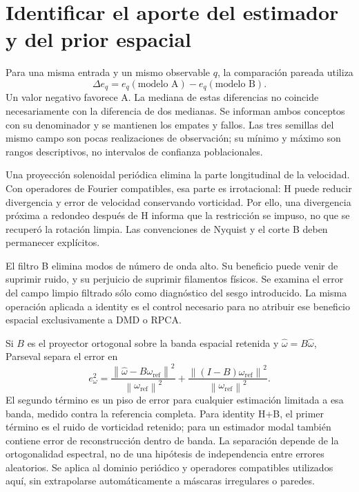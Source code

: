 \documentclass[11pt,oneside,openany]{book}
\newcommand{\norm}[1]{\left\lVert #1\right\rVert}
\begin{document}
\section{Identificar el aporte del estimador y del prior espacial}
Para una misma entrada y un mismo observable $q$, la comparación pareada
utiliza
\begin{equation}
 \Delta e_q=e_q(\text{modelo A})-e_q(\text{modelo B}).
\end{equation}
Un valor negativo favorece A. La mediana de estas diferencias no coincide
necesariamente con la diferencia de dos medianas. Se informan ambos conceptos
con su denominador y se mantienen los empates y fallos. Las tres semillas
del mismo campo son pocas realizaciones de observación; su mínimo y máximo
son rangos descriptivos, no intervalos de confianza poblacionales.

Una proyección solenoidal periódica elimina la parte longitudinal de la
velocidad. Con operadores de Fourier compatibles, esa parte es irrotacional:
H puede reducir divergencia y error de velocidad conservando vorticidad.
Por ello, una divergencia próxima a redondeo después de H informa que la
restricción se impuso, no que se recuperó la rotación limpia. Las convenciones
de Nyquist y el corte B deben permanecer explícitos.

El filtro B elimina modos de número de onda alto. Su beneficio puede venir
de suprimir ruido, y su perjuicio de suprimir filamentos físicos. Se examina
el error del campo limpio filtrado sólo como diagnóstico del sesgo introducido.
La misma operación aplicada a identity es el control necesario para no
atribuir ese beneficio espacial exclusivamente a DMD o RPCA.

Si $B$ es el proyector ortogonal sobre la banda espacial retenida y
$\widehat\omega=B\widehat\omega$, Parseval separa el error en
\begin{equation}
 e_\omega^2=
 \frac{\norm{\widehat\omega-B\omega_{\mathrm{ref}}}^2}
      {\norm{\omega_{\mathrm{ref}}}^2}
 +\frac{\norm{(I-B)\omega_{\mathrm{ref}}}^2}
       {\norm{\omega_{\mathrm{ref}}}^2}.
 \label{eq:band-bias}
\end{equation}
El segundo término es un piso de error para cualquier estimación limitada
a esa banda, medido contra la referencia completa. Para identity H+B, el
primer término es el ruido de vorticidad retenido; para un estimador modal
también contiene error de reconstrucción dentro de banda. La separación
depende de la ortogonalidad espectral, no de una hipótesis de independencia
entre errores aleatorios. Se aplica al dominio periódico y operadores
compatibles utilizados aquí, sin extrapolarse automáticamente a máscaras
irregulares o paredes.
\end{document}
